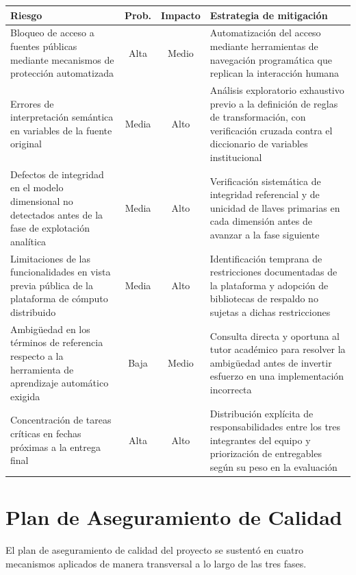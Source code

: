 \documentclass[12pt,a4paper]{article}
\begin{document}
\vspace{6pt}
{\small
\begin{tabularx}{\linewidth}{@{} X c c X @{}}
  \toprule
  \textbf{Riesgo} & \textbf{Prob.} & \textbf{Impacto} & \textbf{Estrategia de mitigación} \\
  \midrule
  Bloqueo de acceso a fuentes públicas mediante mecanismos de protección automatizada
    & Alta & Medio
    & Automatización del acceso mediante herramientas de navegación programática que
      replican la interacción humana \\[6pt]
  Errores de interpretación semántica en variables de la fuente original
    & Media & Alto
    & Análisis exploratorio exhaustivo previo a la definición de reglas de transformación,
      con verificación cruzada contra el diccionario de variables institucional \\[6pt]
  Defectos de integridad en el modelo dimensional no detectados antes de la fase de
  explotación analítica
    & Media & Alto
    & Verificación sistemática de integridad referencial y de unicidad de llaves primarias
      en cada dimensión antes de avanzar a la fase siguiente \\[6pt]
  Limitaciones de las funcionalidades en vista previa pública de la plataforma de
  cómputo distribuido
    & Media & Alto
    & Identificación temprana de restricciones documentadas de la plataforma y adopción
      de bibliotecas de respaldo no sujetas a dichas restricciones \\[6pt]
  Ambigüedad en los términos de referencia respecto a la herramienta de aprendizaje
  automático exigida
    & Baja & Medio
    & Consulta directa y oportuna al tutor académico para resolver la ambigüedad antes
      de invertir esfuerzo en una implementación incorrecta \\[6pt]
  Concentración de tareas críticas en fechas próximas a la entrega final
    & Alta & Alto
    & Distribución explícita de responsabilidades entre los tres integrantes del equipo
      y priorización de entregables según su peso en la evaluación \\
  \bottomrule
\end{tabularx}
}

\newpage
\section{Plan de Aseguramiento de Calidad}

El plan de aseguramiento de calidad del proyecto se sustentó en cuatro mecanismos aplicados de
manera transversal a lo largo de las tres fases.
\end{document}
